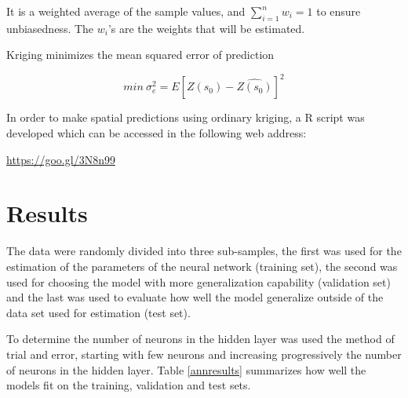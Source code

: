 \documentclass[11pt,twoside]{rmta2010esp}%
\begin{document}
It is a weighted average of the sample values, and $ \sum_{i=1}^{n} w_{i} = 1 $ to ensure unbiasedness. The $w_{i}$'s are the weights that will be estimated. 
  
Kriging minimizes the mean squared error of prediction 

\begin{equation}
min \ \sigma_{e}^{2} = E\left[Z(s_{0}) - \hat{Z(s_{0})}\right]^{2}
\end{equation}  

In order to make spatial predictions using ordinary kriging, a R script was developed which can be accessed in the following web address: 

\url{https://goo.gl/3N8n99}


\section{Results}
The data were randomly divided into three sub-samples, the first was used for the
estimation of the parameters of the neural network (training set), the second was used for
choosing the model with more generalization capability (validation set) and the last was
used to evaluate how well the model generalize outside of the data set used for estimation (test set). 

To determine the number of neurons in the hidden layer was used the method of trial and error, starting with few neurons and increasing progressively the number of neurons in the hidden layer. Table \ref{annresults}
summarizes how well the models fit on the training, validation and test sets.
\end{document}
